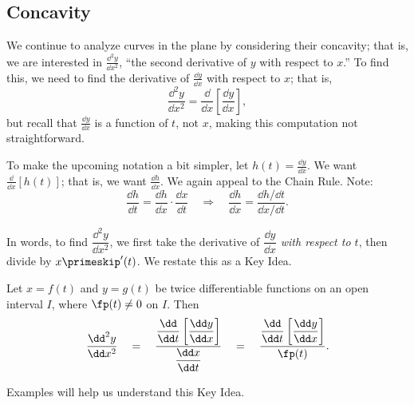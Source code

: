 \subsection{Concavity}

We continue to analyze curves in the plane by considering their concavity; that is, we are interested in $\frac{\dd^2y}{\dd x^2}$, ``the second derivative of $y$ with respect to $x$.'' To find this, we need to find the derivative of $\frac{\dd y}{\dd x}$ with respect to $x$; that is,
\[\frac{\dd^2y}{\dd x^2}=\frac{\dd}{\dd x}\left[\frac{\dd y}{\dd x}\right],\]
but recall that $\frac{\dd y}{\dd x}$ is a function of $t$, not $x$, making this computation not straightforward. 

To make the upcoming notation a bit simpler, let $h(t) = \frac{\dd y}{\dd x}$. We want $\frac{\dd}{\dd x}[h(t)]$; that is, we want $\frac{\dd h}{\dd x}$. We again appeal to the Chain Rule. Note:
\[
\frac{\dd h}{\dd t} = \frac{\dd h}{\dd x}\cdot\frac{\dd x}{\dd t}
\quad \Rightarrow \quad
\frac{\dd h}{\dd x} = \frac{\dd h/\dd t}{\dd x/\dd t}.
\]

In words, to find $\dfrac{\dd^2y}{\dd x^2}$, we first take the derivative of $\dfrac{\dd y}{\dd x}$ \emph{with respect to $t$}, then divide by $x\primeskip'(t)$. We restate this as a Key Idea.

\begin{keyidea}\label{idea:second_der_par}%
Let $x=f(t)$ and $y=g(t)$ be twice differentiable functions on an open interval $I$, where $\fp(t)\neq 0$ on $I$. Then 
\[
\frac{\dd^2y}{\dd x^2}
\quad = \quad
\frac{\dfrac{\dd}{\dd t}\left[\dfrac{\dd y}{\dd x}\right]}{\dfrac{\dd x}{\dd t}}
\quad=\quad
\frac{\dfrac{\dd}{\dd t}\left[\dfrac{\dd y}{\dd x}\right]}{\fp(t)}.
\] 
\end{keyidea}

Examples will help us understand this Key Idea.

